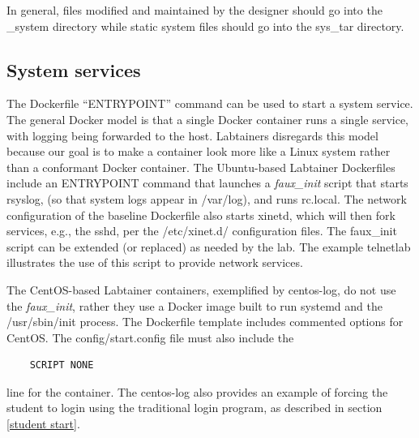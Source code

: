 \documentclass[12pt]{article}
\begin{document}
In general, files modified and maintained by the designer should go into the
\_system directory while static system files should go into the sys\_tar directory.

\subsection {System services}
The Dockerfile ``ENTRYPOINT'' command can be used to start a system service.  The general Docker 
model is that a single Docker container runs a single service, with logging being forwarded to 
the host.  Labtainers disregards this model because our goal is to make a container look more like a Linux
system rather than a conformant Docker container.  The Ubuntu-based Labtainer Dockerfiles include an
ENTRYPOINT command that launches a \textit{faux\_init} script that starts rsyslog, (so that system logs
appear in /var/log), and runs rc.local.  The network configuration of the baseline Dockerfile also starts xinetd,
which will then fork services, e.g., the sshd, per the /etc/xinet.d/ configuration files.  The faux\_init script
can be extended (or replaced) as needed by the lab.  The example telnetlab illustrates the use of this script
to provide network services.

The CentOS-based Labtainer containers, exemplified by centos-log, do not use the \textit{faux\_init}, rather they
use a Docker image built to run systemd and the /usr/sbin/init process.  The Dockerfile template includes
commented options for CentOS.  The config/start.config file must also include the 
\begin{verbatim}
    SCRIPT NONE
\end{verbatim}
\noindent line for the container.  The centos-log also provides an example of forcing 
the student to login using the traditional
login program, as described in section \ref{student start}.
\end{document}
